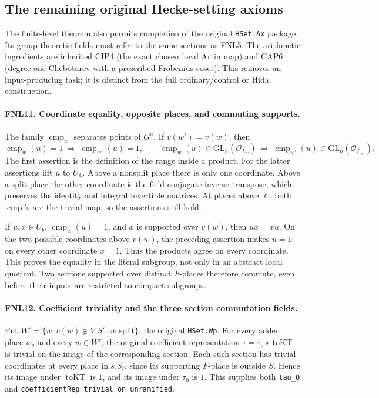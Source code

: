 \documentclass[11pt,a4paper]{article}
\numberwithin{equation}{section}
\theoremstyle{remark}\newtheorem{remark}[theorem]{Remark}
\begin{document}
\subsection{The remaining original Hecke-setting axioms}

The finite-level theorem also permits completion of the original
\texttt{HSet.\allowbreak Ax} package.  Its group-theoretic fields must refer to
the same sections as FNL5.  The arithmetic ingredients are inherited
CIP4 (the exact chosen local Artin map) and CAP6 (degree-one
Chebotarev with a prescribed Frobenius coset).  This removes an
input-producing task; it is distinct from the full ordinary/control
or Hida construction.

\paragraph{FNL11. Coordinate equality, opposite places, and commuting supports.}
\label{claim:FNL11}
The family \(\operatorname{cmp}_w\) separates points of \(G^a\).
If \(v(w')=v(w)\), then
\[
 \operatorname{cmp}_w(u)=1\ \Longrightarrow\
 \operatorname{cmp}_{w'}(u)=1,\qquad
 \operatorname{cmp}_w(u)\in\mathrm{GL}_n(\mathcal O_{L_w})
 \ \Longrightarrow\
 \operatorname{cmp}_{w'}(u)\in\mathrm{GL}_n(\mathcal O_{L_{w'}}).
\]
The first assertion is the definition of the range inside a product.
For the latter assertions lift \(u\) to \(U_{\mathbb A}\).
Above a nonsplit place there is only one coordinate.  Above a split
place the other coordinate is the field conjugate inverse transpose,
which preserves the identity and integral invertible matrices.
At places above \(\ell\), both \(\operatorname{cmp}\)'s are the
trivial map, so the assertions still hold.

If \(u,\allowbreak{} x\in U_b\), \(\operatorname{cmp}_w(u)=1\), and \(x\) is
supported over \(v(w)\), then \(ux=xu\).  On the two possible
coordinates above \(v(w)\), the preceding assertion makes \(u=1\);
on every other coordinate \(x=1\).  Thus the products agree on
every coordinate.  This proves the equality in the literal subgroup,
not only in an abstract local quotient.  Two sections supported over
distinct \(F\)-places therefore commute, even before their inputs
are restricted to compact subgroups.

\paragraph{FNL12. Coefficient triviality and the three section commutation fields.}
\label{claim:FNL12}
Put
\(W'=\{w:v(w)\notin V.S',\ w\text{ split}\}\), the original
\texttt{HSet.\allowbreak Wp}.  For every added place \(w_q\) and every
\(w\in W'\), the original coefficient representation
\(\tau=\tau_0\circ\operatorname{toKT}\) is trivial on the image of
the corresponding section.  Each such section has trivial coordinates
at every place in \(s.S_t\), since its supporting \(F\)-place is
outside \(S\).  Hence its image under \(\operatorname{toKT}\) is
\(1\), and its image under \(\tau_0\) is \(1\).
This supplies both \texttt{tau\_\allowbreak Q} and
\texttt{coefficient\allowbreak Rep\_\allowbreak trivial\_\allowbreak on\_\allowbreak unramified}.
\end{document}

